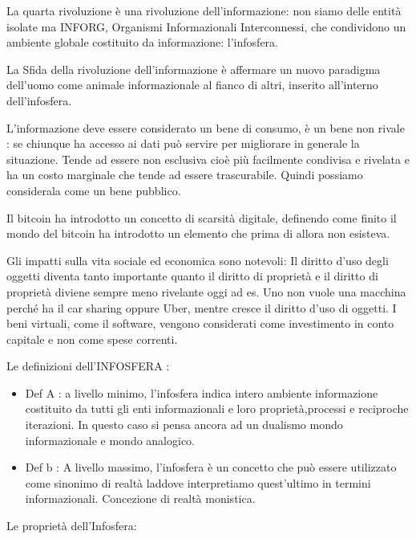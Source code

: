 \documentclass[]{article}
\begin{document}
La quarta rivoluzione è una rivoluzione dell'informazione: non siamo
delle entità isolate ma INFORG, Organismi Informazionali Interconnessi,
che condividono un ambiente globale costituito da informazione:
l'infosfera.

La Sfida della rivoluzione dell'informazione è affermare un nuovo
paradigma dell'uomo come animale informazionale al fianco di altri,
inserito all'interno dell'infosfera.

L'informazione deve essere considerato un bene di consumo, è un bene non
rivale : se chiunque ha accesso ai dati può servire per migliorare in
generale la situazione. Tende ad essere non esclusiva cioè più
facilmente condivisa e rivelata e ha un costo marginale che tende ad
essere trascurabile. Quindi possiamo considerala come un bene pubblico.

Il bitcoin ha introdotto un concetto di scarsità digitale, definendo
come finito il mondo del bitcoin ha introdotto un elemento che prima di
allora non esisteva.

Gli impatti sulla vita sociale ed economica sono notevoli: Il diritto
d'uso degli oggetti diventa tanto importante quanto il diritto di
proprietà e il diritto di proprietà diviene sempre meno rivelante oggi
ad es. Uno non vuole una macchina perché ha il car sharing oppure Uber,
mentre cresce il diritto d'uso di oggetti. I beni virtuali, come il
software, vengono considerati come investimento in conto capitale e non
come spese correnti.

Le definizioni dell'INFOSFERA :

\begin{itemize}
	 
	\item
	Def A : a livello minimo, l'infosfera indica intero ambiente
	informazione costituito da tutti gli enti informazionali e loro
	proprietà,processi e reciproche iterazioni.
	In questo caso si pensa ancora ad un dualismo mondo informazionale
	e mondo analogico.
	\item
	Def b : A livello massimo, l'infosfera è un concetto che può essere
	utilizzato come sinonimo di realtà laddove interpretiamo quest'ultimo
	in termini informazionali. Concezione di realtà monistica.
\end{itemize}

Le proprietà dell'Infosfera:
\end{document}
